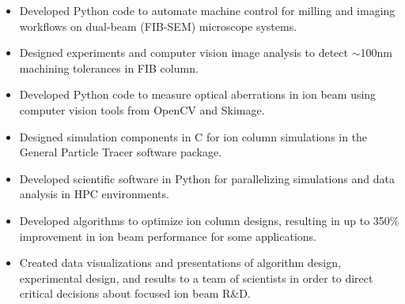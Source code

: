 \documentclass[letterpaper,10.8pt]{article}
\begin{document}
    \begin{itemize}[leftmargin=*,label={$\diamond$}]
    \itemsep0em %
    
    	\item {Developed Python code to automate machine control for milling and imaging workflows on dual-beam (FIB-SEM) microscope systems.}
	
	\item {Designed experiments and computer vision image analysis to detect $\sim$100nm machining tolerances in FIB column.}
	
	\item {Developed Python code to measure optical aberrations in ion beam using computer vision tools from OpenCV and Skimage.}
	
	\item {Designed simulation components in C for ion column simulations in the General Particle Tracer software package.}
	
	\item {Developed scientific software in Python for parallelizing simulations and data analysis in HPC environments.}
	
	\item {Developed algorithms to optimize ion column designs, resulting in up to 350\% improvement in ion beam performance for some applications.}
	
	\item {Created data visualizations and presentations of algorithm design, experimental design, and results to a team of scientists in order to direct critical decisions about focused ion beam R\&D.}
	
	\end{itemize} %
      
\end{document}
